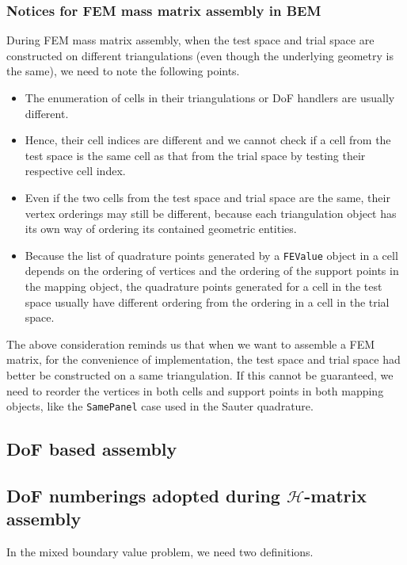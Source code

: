 \documentclass[11pt, a4paper]{article}
\begin{document}
\subsubsection{Notices for FEM mass matrix assembly in BEM}
\label{sec:fem-mass-matrix-assembly-in-bem}
During FEM mass matrix assembly, when the test space and trial space are constructed on different triangulations (even though the underlying geometry is the same), we need to note the following points.
\begin{itemize}
\item The enumeration of cells in their triangulations or DoF handlers are usually different.
\item Hence, their cell indices are different and we cannot check if a cell from the test space is the same cell as that from the trial space by testing their respective cell index.
\item Even if the two cells from the test space and trial space are the same, their vertex orderings may still be different, because each triangulation object has its own way of ordering its contained geometric entities.
\item Because the list of quadrature points generated by a \texttt{FEValue} object in a cell depends on the ordering of vertices and the ordering of the support points in the mapping object, the quadrature points generated for a cell in the test space usually have different ordering from the ordering in a cell in the trial space.
\end{itemize}
The above consideration reminds us that when we want to assemble a FEM matrix, for the convenience of implementation, the test space and trial space had better be constructed on a same triangulation. If this cannot be guaranteed, we need to reorder the vertices in both cells and support points in both mapping objects, like the \texttt{SamePanel} case used in the Sauter quadrature.

\subsection{DoF based assembly}

\subsection{DoF numberings adopted during $\mathcal{H}$-matrix assembly}

In the mixed boundary value problem, we need two definitions.
\end{document}
